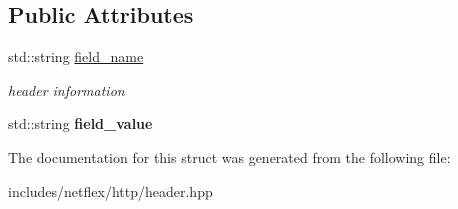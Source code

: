 \subsection*{Public Attributes}
\begin{DoxyCompactItemize}
\item 
\mbox{\label{structnetflex_1_1http_1_1header_ae72e56634fc6e2ec9ce4ff1bd633eaff}} 
std\+::string \hyperlink{structnetflex_1_1http_1_1header_ae72e56634fc6e2ec9ce4ff1bd633eaff}{field\+\_\+name}
\begin{DoxyCompactList}\small\item\em header information \end{DoxyCompactList}\item 
\mbox{\label{structnetflex_1_1http_1_1header_ab8ddd4c11c3775694f64976b5be29753}} 
std\+::string {\bfseries field\+\_\+value}
\end{DoxyCompactItemize}


The documentation for this struct was generated from the following file\+:\begin{DoxyCompactItemize}
\item 
includes/netflex/http/header.\+hpp\end{DoxyCompactItemize}
